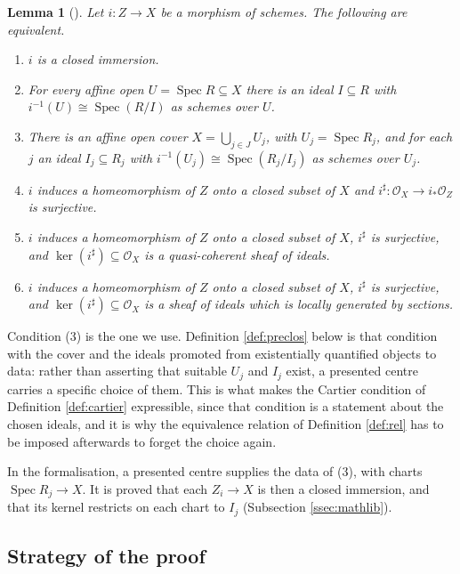 \documentclass[pdflatex,sn-mathphys-num]{sn-jnl}
\theoremstyle{plain}
\newtheorem{lemma}[theorem]{Lemma}
\theoremstyle{definition}
\newcommand{\Spec}{\operatorname{Spec}}
\newcommand{\sO}{\mathcal{O}}
\begin{document}
\begin{lemma}[{\cite[\href{https://stacks.math.columbia.edu/tag/01QN}{Tag
01QN}]{stacks-project}}]\label{lem:closed-imm}
Let $i : Z \to X$ be a morphism of schemes. The following are equivalent.
\begin{enumerate}
\item $i$ is a closed immersion.
\item For every affine open $U = \Spec R \subseteq X$ there is an ideal
      $I \subseteq R$ with $i^{-1}(U) \cong \Spec(R/I)$ as schemes over $U$.
\item There is an affine open cover $X = \bigcup_{j \in J} U_j$, with
      $U_j = \Spec R_j$, and for each $j$ an ideal $I_j \subseteq R_j$ with
      $i^{-1}(U_j) \cong \Spec(R_j / I_j)$ as schemes over $U_j$.
\item $i$ induces a homeomorphism of $Z$ onto a closed subset of $X$ and
      $i^{\sharp} : \sO_X \to i_* \sO_Z$ is surjective.
\item $i$ induces a homeomorphism of $Z$ onto a closed subset of $X$,
      $i^{\sharp}$ is surjective, and $\ker(i^{\sharp}) \subseteq \sO_X$ is a
      quasi-coherent sheaf of ideals.
\item $i$ induces a homeomorphism of $Z$ onto a closed subset of $X$,
      $i^{\sharp}$ is surjective, and $\ker(i^{\sharp}) \subseteq \sO_X$ is a
      sheaf of ideals which is locally generated by sections.
\end{enumerate}
\end{lemma}

Condition (3) is the one we use. Definition \ref{def:preclos} below is that
condition with the cover and the ideals promoted from existentially quantified
objects to data: rather than asserting that suitable $U_j$ and $I_j$ exist, a
presented centre carries a specific choice of them. This is what makes the
Cartier condition of Definition \ref{def:cartier} expressible, since that
condition is a statement about the chosen ideals, and it is why the equivalence
relation of Definition \ref{def:rel} has to be imposed afterwards to forget the
choice again.

In the formalisation, a presented centre supplies the data of (3), with charts
$\Spec R_j \to X$. It is proved that each $Z_i \to X$ is then a closed
immersion, and that its kernel restricts on each chart to $I_j$
(Subsection \ref{ssec:mathlib}).

\subsection{Strategy of the proof}\label{sec:strategy}
\end{document}
